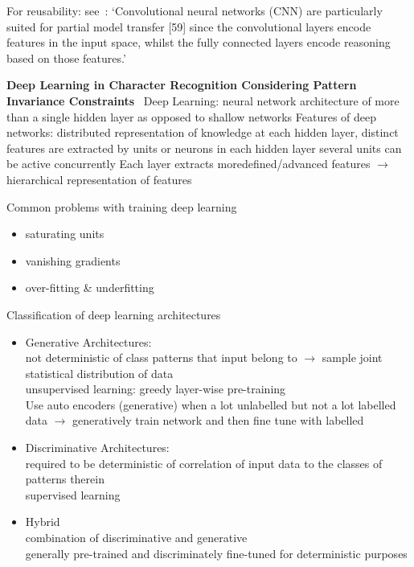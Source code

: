 
For reusability: see~\citep{ashmore_assuring_2021}: `Convolutional neural networks (CNN) are
particularly suited for partial model transfer [59] since the convolutional layers encode
features in the input space, whilst the fully connected layers encode reasoning based on those
features.'


\textbf{Deep Learning in Character Recognition Considering Pattern Invariance
Constraints}~\citep{oyedotun_deep_2015}
Deep Learning: neural network architecture of more than a single hidden layer as opposed to shallow networks
Features of deep networks: distributed representation of knowledge at each hidden layer, distinct
features are extracted by units or neurons in each hidden layer
several units can be active concurrently
Each layer extracts moredefined/advanced features $\rightarrow$ hierarchical representation of
features

Common problems with training deep learning
\begin{itemize}
    \item saturating units
    \item vanishing gradients
    \item over-fitting \& underfitting
\end{itemize}

Classification of deep learning architectures
\begin{itemize}
    \item Generative Architectures:\\
        not deterministic of class patterns that input belong to $\rightarrow$ sample joint
        statistical distribution of data\\
        unsupervised learning: greedy layer-wise pre-training\\
        Use auto encoders (generative) when a lot unlabelled but not a lot labelled data
        $\rightarrow$ generatively train network and then fine tune with labelled
    \item Discriminative Architectures:\\
        required to be deterministic of correlation of input data to the classes of patterns therein\\
        supervised learning
    \item Hybrid\\
        combination of discriminative and generative\\
        generally pre-trained and discriminately fine-tuned for deterministic purposes
\end{itemize}

